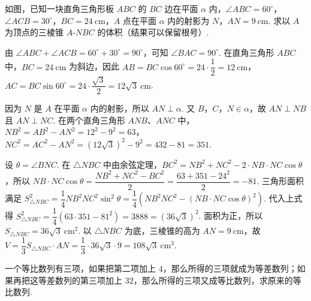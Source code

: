 \begin{problem}
如图，已知一块直角三角形板 \(ABC\) 的 \(BC\) 边在平面 \(\alpha\) 内，\(\angle ABC=60^{\circ}\)，\(\angle ACB=30^{\circ}\)，\(BC=24\mathrm{~cm}\)，\(A\) 点在平面 \(\alpha\) 内的射影为 \(N\)，\(AN=9\mathrm{~cm}\). 求以 \(A\) 为顶点的三棱锥 \(A\text{-}NBC\) 的体积（结果可以保留根号）.

\begin{center}
\end{center}
\end{problem}

\begin{solution}
由 \(\angle ABC+\angle ACB=60^{\circ}+30^{\circ}=90^{\circ}\)，可知 \(\angle BAC=90^{\circ}\). 在直角三角形 \(ABC\) 中，\(BC=24\mathrm{~cm}\) 为斜边，因此 \(AB=BC\cos60^{\circ}=24\cdot\dfrac12=12\mathrm{~cm}\)，\(AC=BC\sin60^{\circ}=24\cdot\dfrac{\sqrt3}{2}=12\sqrt3\mathrm{~cm}\).

因为 \(N\) 是 \(A\) 在平面 \(\alpha\) 内的射影，所以 \(AN\perp\alpha\). 又 \(B\)，\(C\)，\(N\in\alpha\)，故 \(AN\perp NB\) 且 \(AN\perp NC\). 在两个直角三角形 \(ANB\)、\(ANC\) 中，\(NB^2=AB^2-AN^2=12^2-9^2=63\)，\(NC^2=AC^2-AN^2=\left(12\sqrt3\right)^2-9^2=432-81=351\).

设 \(\theta=\angle BNC\). 在 \(\triangle NBC\) 中由余弦定理，\(BC^2=NB^2+NC^2-2\cdot NB\cdot NC\cos\theta\)，所以 \(NB\cdot NC\cos\theta=\dfrac{NB^2+NC^2-BC^2}{2}=\dfrac{63+351-24^2}{2}=-81\). 三角形面积满足 \(S_{\triangle NBC}^2=\dfrac14NB^2NC^2\sin^2\theta=\dfrac14\left(NB^2NC^2-\left(NB\cdot NC\cos\theta\right)^2\right)\). 代入上式得 \(S_{\triangle NBC}^2=\dfrac14\left(63\cdot351-81^2\right)=3888=(36\sqrt3)^2\). 面积为正，所以 \(S_{\triangle NBC}=36\sqrt3\mathrm{~cm}^2\). 以 \(\triangle NBC\) 为底，三棱锥的高为 \(AN=9\mathrm{~cm}\)，故 \(V=\dfrac13S_{\triangle NBC}\cdot AN=\dfrac13\cdot36\sqrt3\cdot9=108\sqrt3\mathrm{~cm}^3\).
\end{solution}

\begin{problem}
一个等比数列有三项，如果把第二项加上 \(4\)，那么所得的三项就成为等差数列；如果再把这等差数列的第三项加上 \(32\)，那么所得的三项又成等比数列，求原来的等比数列.
\end{problem}

